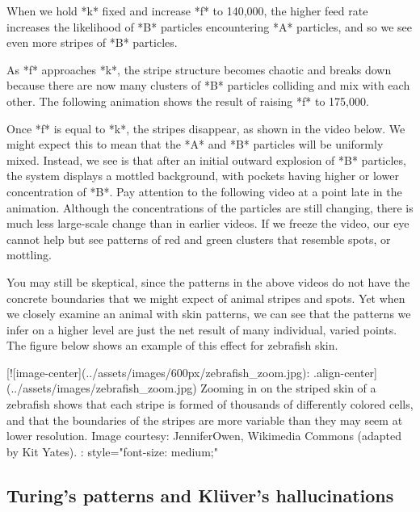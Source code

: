 {{{{{%

When we hold *k* fixed and increase *f* to 140,000, the higher feed rate increases the likelihood of *B* particles encountering *A* particles, and so we see even more stripes of *B* particles.

{%

As *f* approaches *k*, the stripe structure becomes chaotic and breaks down because there are now many clusters of *B* particles colliding and mix with each other. The following animation shows the result of raising *f* to 175,000.

{%

Once *f* is equal to *k*, the stripes disappear, as shown in the video below. We might expect this to mean that the *A* and *B* particles will be uniformly mixed. Instead, we see is that after an initial outward explosion of *B* particles, the system displays a mottled background, with pockets having higher or lower concentration of *B*. Pay attention to the following video at a point late in the animation. Although the concentrations of the particles are still changing, there is much less large-scale change than in earlier videos. If we freeze the video, our eye cannot help but see patterns of red and green clusters that resemble spots, or mottling.

{%

You may still be skeptical, since the patterns in the above videos do not have the concrete boundaries that we might expect of animal stripes and spots. Yet when we closely examine an animal with skin patterns, we can see that the patterns we infer on a higher level are just the net result of many individual, varied points. The figure below shows an example of this effect for zebrafish skin.

[![image-center](../assets/images/600px/zebrafish_zoom.jpg){: .align-center}](../assets/images/zebrafish_zoom.jpg)
Zooming in on the striped skin of a zebrafish shows that each stripe is formed of thousands of differently colored cells, and that the boundaries of the stripes are more variable than they may seem at lower resolution. Image courtesy: JenniferOwen, Wikimedia Commons (adapted by Kit Yates).
{: style="font-size: medium;"}

\FloatBarrier
{}
\subsection{Turing's patterns and Klüver's hallucinations}

}}}}}}}}
